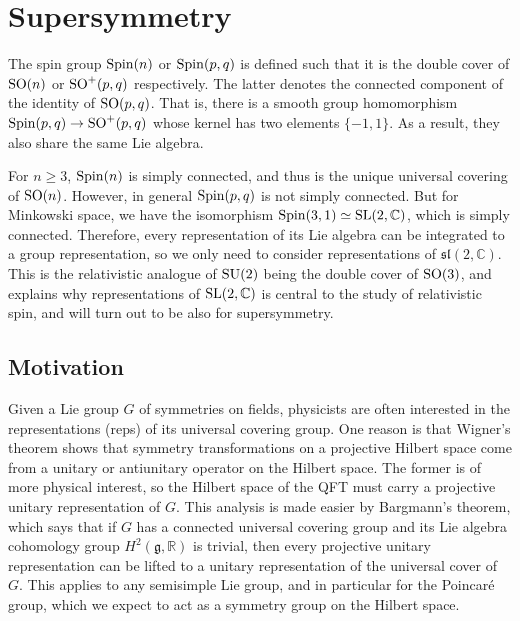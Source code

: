 \chapter{Supersymmetry} 
\label{chapter5}

The spin group $\operatorname{Spin}(n)$ or $\operatorname{Spin}(p,q)$ is defined such that it is the double cover of
$\operatorname{SO}(n)$ or $\operatorname{SO}^+(p,q)$ respectively. 
The latter denotes the connected component of the identity of $\operatorname{SO}(p,q)$. 
That is, there is a smooth group homomorphism $\operatorname{Spin}(p,q) \to \operatorname{SO}^+(p,q)$ whose kernel
has two elements $\{-1,1\}$. 
As a result, they also share the same Lie algebra.

For $n\geq 3$,
$\operatorname{Spin}(n)$ is simply connected, and thus is the unique universal covering 
of $\operatorname{SO}(n)$. However, in general $\operatorname{Spin}(p,q)$ is not simply connected. 
But for Minkowski space, we have the isomorphism $\operatorname{Spin}(3,1) \simeq
\operatorname{SL}(2,\mathbb{C})$, which is simply connected. 
Therefore, every representation of its Lie algebra can be integrated to a group
representation, so we only need to consider representations of
$\mathfrak{sl}(2,\mathbb{C})$.\cite[Theorem 5.6]{hall} 
This is the relativistic analogue of $\operatorname{SU}(2)$ being the double cover of  $\operatorname{SO}(3)$,
and explains why representations of $\operatorname{SL}(2,\mathbb{C})$ is central to the study
of relativistic spin, and will turn out to be also for supersymmetry. 


\section{Motivation}
Given a Lie group $G$ of symmetries on fields, physicists are often interested in the 
representations (reps) of its universal covering group. One reason is that
Wigner's theorem shows that symmetry transformations on a projective Hilbert space 
come from a unitary or antiunitary operator on the Hilbert space. The
former is of more physical interest, so the Hilbert
space of the QFT must carry a projective unitary representation of $G$. 
This analysis is made easier by
Bargmann's theorem, which says that if $G$ has a connected universal covering
group and its Lie algebra cohomology group
$H^2(\mathfrak{g},\mathbb{R})$ is trivial, then every projective unitary
representation can be lifted to a unitary representation of the universal cover
of $G$.\cite[Theorem 4.8]{cft} 
This applies to any semisimple Lie
group, and in particular for the Poincar\'e group, which we expect to act as a
symmetry group on the Hilbert space.  

